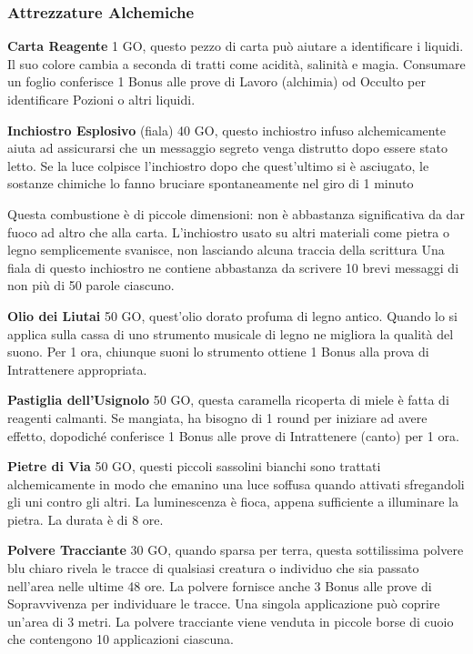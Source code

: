 \documentclass[12pt,a4paper,twoside,openany]{book}
\begin{document}
\begin{multicols}{2}
\subsubsection{Attrezzature Alchemiche}

\textbf{Carta Reagente} 1 GO, questo pezzo di carta può aiutare a identificare i liquidi. Il suo colore cambia a seconda di tratti come acidità, salinità e magia. Consumare un foglio conferisce 1 Bonus alle prove di Lavoro (alchimia) od Occulto per identificare Pozioni o altri liquidi.

\textbf{Inchiostro Esplosivo} (fiala) 40 GO, questo inchiostro infuso alchemicamente aiuta ad assicurarsi che un messaggio segreto venga distrutto dopo essere stato letto. Se la luce colpisce l'inchiostro dopo che quest'ultimo si è asciugato, le sostanze chimiche lo fanno bruciare spontaneamente nel giro di 1 minuto

Questa combustione è di piccole dimensioni: non è abbastanza significativa da dar fuoco ad altro che alla carta. L'inchiostro usato su altri materiali come pietra o legno semplicemente svanisce, non lasciando alcuna traccia della scrittura
Una fiala di questo inchiostro ne contiene abbastanza da scrivere 10 brevi messaggi di non più di 50 parole ciascuno.

\textbf{Olio dei Liutai} 50 GO, quest'olio dorato profuma di legno antico. Quando lo si applica sulla cassa di uno strumento musicale di legno ne migliora la qualità del suono. Per 1 ora, chiunque suoni lo strumento ottiene 1 Bonus alla prova di Intrattenere appropriata.

\textbf{Pastiglia dell'Usignolo} 50 GO, questa caramella ricoperta di miele è fatta di reagenti calmanti. Se mangiata, ha bisogno di 1 round per iniziare ad avere effetto, dopodiché conferisce 1 Bonus alle prove di Intrattenere (canto) per 1 ora.

\textbf{Pietre di Via} 50 GO, questi piccoli sassolini bianchi sono trattati alchemicamente in modo che emanino una luce soffusa quando attivati sfregandoli gli uni contro gli altri. La luminescenza è fioca, appena sufficiente a illuminare la pietra. La durata è di 8 ore.

\textbf{Polvere Tracciante} 30 GO, quando sparsa per terra, questa sottilissima polvere blu chiaro rivela le tracce di qualsiasi creatura o individuo che sia passato nell'area nelle ultime 48 ore.
La polvere fornisce anche 3 Bonus alle prove di Sopravvivenza per individuare le tracce. Una singola applicazione può coprire un'area di 3 metri. La polvere tracciante viene venduta in piccole borse di cuoio che contengono 10 applicazioni ciascuna.


\end{multicols}
\end{document}
